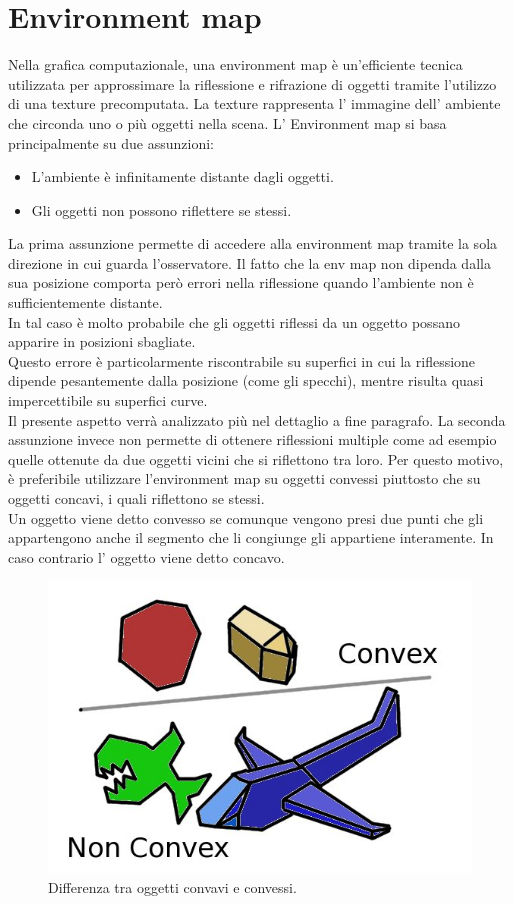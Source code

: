 \section{Environment map}
\label{sec:chapter_stato_arte_envmap}

Nella grafica computazionale, una environment map è un’efficiente tecnica utilizzata per approssimare la riflessione e rifrazione di oggetti tramite l’utilizzo di una texture precomputata.
La texture rappresenta l’ immagine dell’ ambiente che circonda uno o più oggetti nella scena.
L’ Environment map si basa principalmente su due assunzioni:
\begin{itemize}
\item L’ambiente è infinitamente distante dagli oggetti.
\item Gli oggetti non possono riflettere se stessi.
\end{itemize}
La prima assunzione permette di accedere alla environment map tramite la sola direzione in cui guarda l’osservatore. Il fatto che la env map non dipenda dalla sua posizione comporta però errori nella riflessione quando l’ambiente non è sufficientemente distante. 
\\
In tal caso è molto probabile che gli oggetti riflessi da un oggetto possano apparire in posizioni sbagliate.
\\
Questo errore è particolarmente riscontrabile su superfici in cui la riflessione dipende pesantemente dalla posizione (come gli specchi), mentre risulta quasi impercettibile su superfici curve. 
\\
Il presente aspetto verrà analizzato più nel dettaglio a fine paragrafo.
La seconda assunzione invece non permette di ottenere riflessioni multiple come ad esempio quelle ottenute da due oggetti vicini che si riflettono tra loro. Per questo motivo, è preferibile utilizzare l’environment map su oggetti convessi piuttosto che su oggetti concavi, i quali riflettono se stessi.
\\
Un oggetto viene detto convesso se comunque vengono presi due punti che gli appartengono anche il segmento che li congiunge gli appartiene interamente. In caso contrario l’ oggetto viene detto concavo.
\begin{figure}[htb]
 \centering
 \includegraphics[width=0.5\linewidth]{images/chapter_stato_arte/stato_arte_conc_conv.jpg}\hfill
 \caption[Concavo,convesso]{Differenza tra oggetti convavi e convessi.}
 \label{fig:stato_arte_conc_conv}
\end{figure}
